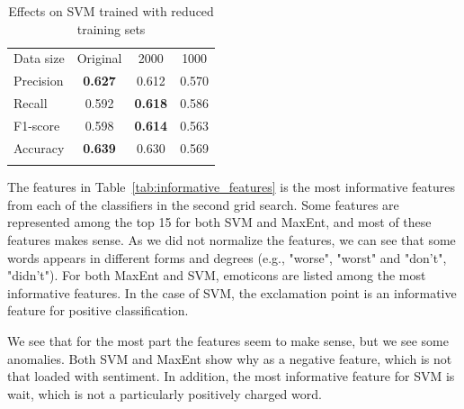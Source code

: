 \begin{table}[!htb]
	\centering
	\begin{tabular}{l|ccc} 
	\noalign{\smallskip}\hline\noalign{\smallskip}
	Data size  & Original       & 2000   & 1000 \\
	\noalign{\smallskip}\hline\noalign{\smallskip}
	Precision  & {\bf 0.627}  & 0.612 & 0.570 \\
	Recall       & 0.592  & \textbf{0.618} & 0.586 \\
	F1-score  & 0.598  & \textbf{0.614} & 0.563 \\
	Accuracy & {\bf 0.639}  & 0.630 & 0.569 \\
	\noalign{\smallskip}\hline\noalign{\smallskip}
	\end{tabular}
	\caption{Effects on SVM trained with reduced training sets}
	\label{tab:svm_reduced}
\end{table}

The features in Table~\ref{tab:informative_features} is the most informative features from each of the classifiers in the second grid search. Some features are represented among the top 15 for both SVM and MaxEnt, and most of these features makes sense. As we did not normalize the features, we can see that some words appears in different forms and degrees (e.g., "worse", "worst" and "don't", "didn't"). For both MaxEnt and SVM, emoticons are listed among the most informative features. In the case of SVM, the exclamation point is an informative feature for positive classification.

We see that for the most part the features seem to make sense, but we see some anomalies. Both SVM and MaxEnt show why as a negative feature, which is not that loaded with sentiment. In addition, the most informative feature for SVM is wait, which is not a particularly positively charged word.

